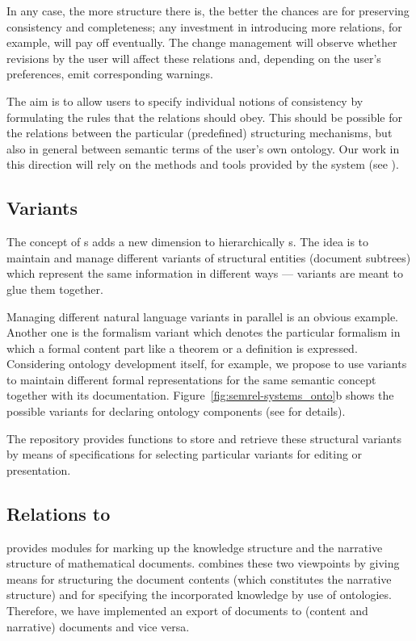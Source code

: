 In any case, the more structure there is, the better the chances are for preserving
consistency and completeness; any investment in introducing more {}
relations, for example, will pay off eventually. The change management will observe
whether revisions by the user will affect these relations and, depending on the user's
preferences, emit corresponding warnings.

The aim is to allow users to specify individual notions of consistency by formulating the
rules that the relations should obey. This should be possible for the relations between
the particular (predefined) structuring mechanisms, but also in general between semantic
terms of the user's own ontology. Our work in this direction will rely on the methods and
tools provided by the {\hets} system (see {}).

\subsection{Variants}

The concept of {s} adds a new dimension to hierarchically
{s}.  The idea is to maintain and manage different variants
of structural entities (document subtrees) which represent the same information in
different ways --- variants are meant to glue them together.

Managing different natural language variants in parallel is an obvious example.  Another
one is the formalism variant which denotes the particular formalism in which a formal
content part like a theorem or a definition is expressed. Considering ontology development
itself, for example, we propose to use variants to maintain different formal
representations for the same semantic concept together with its documentation.
Figure~\ref{fig:semrel-systems_onto}b shows the possible variants for declaring ontology
components (see \cite{WOSE-2004} for details).

The \MMISS{} repository provides functions to store and retrieve these structural variants
by means of specifications for selecting particular variants for editing or presentation.

\subsection{Relations to {\omdoc}}

{\omdoc} provides modules for marking up the knowledge structure and the narrative
structure of mathematical documents. \MMISS{} combines these two viewpoints by giving
means for structuring the document contents (which constitutes the narrative structure) and
for specifying the incorporated knowledge by use of ontologies. Therefore, we have
implemented an export of \MMISS{} documents to (content and narrative) {\omdoc} documents
and vice versa.

